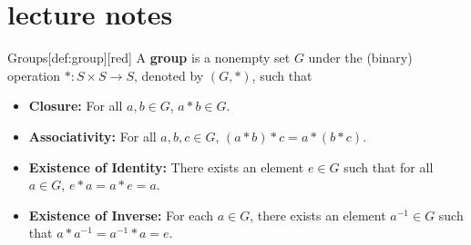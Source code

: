 
\section*{lecture notes}

\begin{define}{Groups}[def:group][red]
  A \textbf{group} is a nonempty set \(G\) under the (binary) 
  operation \(*: S \times S \to S\), denoted by \((G, *)\), such that
  \begin{itemize}
    \item \textbf{Closure:} For all \(a, b \in G\), \(a * b \in G\).
    \item \textbf{Associativity:} For all \(a, b, c \in G\), \((a * b) * c = a * (b * c)\).
    \item \textbf{Existence of Identity:} There exists an element \(e \in G\) 
    such that for all \(a \in G\), \(e * a = a * e = a\).
    \item \textbf{Existence of Inverse:} For each \(a \in G\), there exists an 
    element \(a^{-1} \in G\) such that \(a * a^{-1} = a^{-1} * a = e\).
  \end{itemize}
\end{define}

